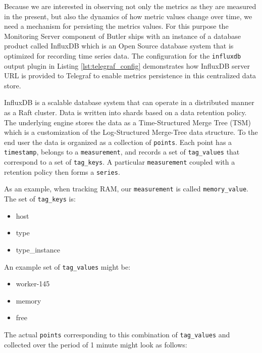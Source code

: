 Because we are interested in observing not only the metrics as they are measured in the present, but also the dynamics of how metric values change over time, we need a mechanism for persisting the metrics values. For this purpose the Monitoring Server component of Butler ships with an instance of a database product called InfluxDB\autocite{InfluxDB} which is an Open Source database system that is optimized for recording time series data. The configuration for the \texttt{influxdb} output plugin in Listing \ref{lst:telegraf_config} demonstrates how InfluxDB server URL is provided to Telegraf to enable metrics persistence in this centralized data store.

InfluxDB is a scalable database system that can operate in a distributed manner as a Raft\autocite{ongaro2014search} cluster. Data is written into shards based on a data retention policy. The underlying engine stores the data as a Time-Structured Merge Tree (TSM) which is a customization of the Log-Structured Merge-Tree\autocite{o1996log} data structure. To the end user the data is organized as a collection of \texttt{points}. Each point has a \texttt{timestamp}, belongs to a \texttt{measurement}, and records a set of \texttt{tag_values} that correspond to a set of \texttt{tag_keys}. A particular \texttt{measurement} coupled with a retention policy then forms a \texttt{series}.

As an example, when tracking RAM, our \texttt{measurement} is called \texttt{memory_value}. The set of \texttt{tag_keys} is:

\begin{itemize}
\item host
\item type
\item type\_instance
\end{itemize}

An example set of \texttt{tag_values} might be:

\begin{itemize}
\item worker-145
\item memory
\item free
\end{itemize}

The actual \texttt{points} corresponding to this combination of \texttt{tag_values} and collected over the period of 1 minute might look as follows:

